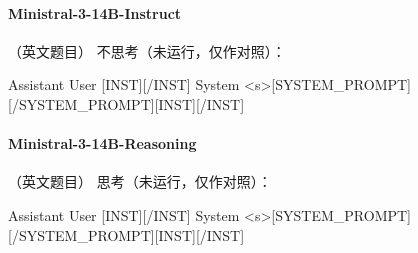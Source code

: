 \paragraph{Ministral-3-14B-Instruct} （英文题目）
\noindent 不思考（未运行，仅作对照）：
\begin{Rendering}
Assistant  
User       [INST]\NL{}\NL{}[/INST]
System     <s>[SYSTEM_PROMPT][/SYSTEM_PROMPT][INST][/INST]
\end{Rendering}
\paragraph{Ministral-3-14B-Reasoning} （英文题目）
\noindent 思考（未运行，仅作对照）：
\begin{Rendering}
Assistant  
User       [INST]\NL{}\NL{}[/INST]
System     <s>[SYSTEM_PROMPT][/SYSTEM_PROMPT][INST][/INST]
\end{Rendering}
